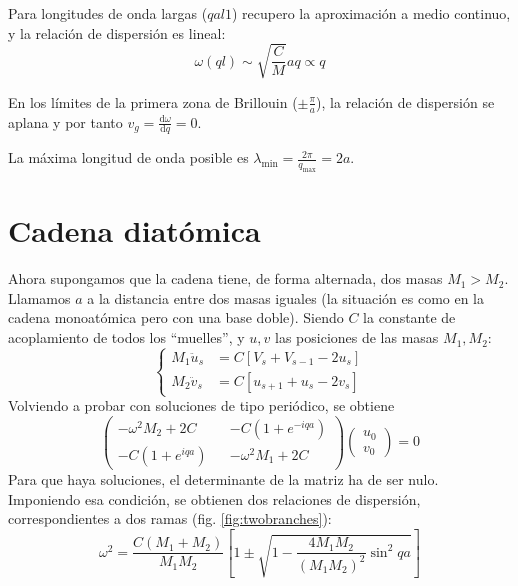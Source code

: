 Para longitudes de onda largas ($qa l 1$) recupero la aproximación a
medio continuo, y la relación de dispersión es lineal:
\begin{equation}
  \omega(q l) \sim \sqrt{ \frac{C}{M}}aq \propto q
\end{equation}

En los límites de la primera zona de Brillouin ($\pm \frac{\pi}{a}$),
la relación de dispersión se aplana y por tanto $v_g =
\frac{\text{d}\omega}{\text{d}q} = 0$.

La máxima longitud de onda posible es $\lambda_{\text{min}} =
\frac{2\pi}{q_{\text{max}}} = 2a$.

\section{Cadena diatómica}
Ahora supongamos que la cadena tiene, de forma alternada, dos masas
$M_1 > M_2$. Llamamos $a$ a la distancia entre dos masas iguales (la
situación es como en la cadena monoatómica pero con una base
doble). Siendo $C$ la constante de acoplamiento de todos los
``muelles'', y $u,v$ las posiciones de las masas $M_1, M_2$:
\begin{equation}
  \begin{cases}
    M_1 \ddot u_s &= C [V_s + V_{s-1} - 2u_s] \\
    M_2 \ddot v_s &= C [u_{s+1} + u_{s} - 2v_s]
  \end{cases}
\end{equation}
Volviendo a probar con soluciones de tipo periódico, se obtiene
\begin{equation}
  \begin{pmatrix}
    -\omega^2M_2 + 2C && -C(1+e^{-iqa}) \\
    -C(1+e^{iqa}) && -\omega^2M_1 + 2C
  \end{pmatrix}
  \begin{pmatrix}
    u_0 \\ v_0
  \end{pmatrix} = 0
\end{equation}
Para que haya soluciones, el determinante de la matriz ha de ser
nulo. Imponiendo esa condición, se obtienen dos relaciones de
dispersión, correspondientes a dos ramas (fig. \ref{fig:twobranches}):
\begin{equation}
  \omega^2 = \frac{C(M_1+M_2)}{M_1M_2} \left[ 1 \pm \sqrt {1 - \frac{4
      M_1M_2}{(M_1M_2)^2}\sin^2qa} \right]
\end{equation}
